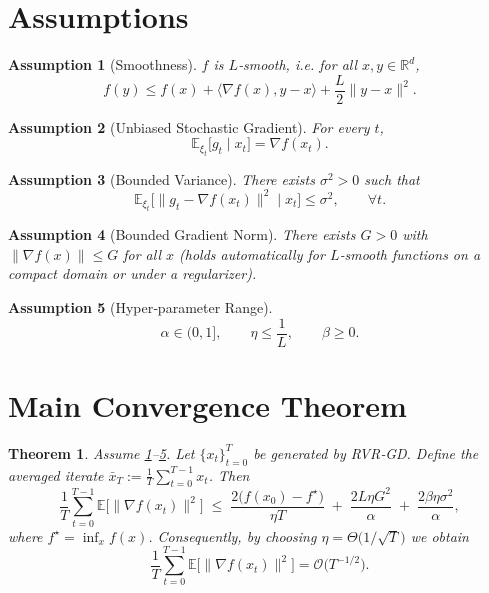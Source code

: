\documentclass{article}
\newtheorem{theorem}{Theorem}
\newtheorem{assumption}{Assumption}
\newcommand{\E}{\mathbb{E}}
\begin{document}
\section*{Assumptions}
\begin{assumption}[Smoothness]\label{as:smooth}
$f$ is $L$‑smooth, i.e. for all $x,y\in\mathbb{R}^d$,
\[
f(y)\le f(x)+\langle\nabla f(x),y-x\rangle+\frac{L}{2}\|y-x\|^2 .
\]
\end{assumption}
\begin{assumption}[Unbiased Stochastic Gradient]\label{as:unbiased}
For every $t$, 
\[
\E_{\xi_t}\bigl[g_t \mid x_t\bigr]=\nabla f(x_t).
\]
\end{assumption}
\begin{assumption}[Bounded Variance]\label{as:var}
There exists $\sigma^2>0$ such that
\[
\E_{\xi_t}\bigl[\|g_t-\nabla f(x_t)\|^2\mid x_t\bigr]\le\sigma^2,\qquad\forall t .
\]
\end{assumption}
\begin{assumption}[Bounded Gradient Norm]\label{as:gradbound}
There exists $G>0$ with $\|\nabla f(x)\|\le G$ for all $x$ (holds automatically for $L$‑smooth functions on a compact domain or under a regularizer).
\end{assumption}
\begin{assumption}[Hyper‑parameter Range]\label{as:hyper}
\[
\alpha\in(0,1],\qquad \eta\le\frac{1}{L},\qquad \beta\ge 0 .
\]
\end{assumption}

\section*{Main Convergence Theorem}
\begin{theorem}\label{thm:main}
Assume \ref{as:smooth}–\ref{as:hyper}. Let $\{x_t\}_{t=0}^{T}$ be generated by RVR‑GD. Define the averaged iterate $\bar x_T:=\frac1T\sum_{t=0}^{T-1}x_t$. Then
\[
\frac1T\sum_{t=0}^{T-1}\E\!\bigl[\|\nabla f(x_t)\|^2\bigr]\;\le\;
\frac{2\bigl(f(x_0)-f^\star\bigr)}{\eta T}
\;+\; \frac{2L\eta G^2}{\alpha}
\;+\; \frac{2\beta\eta\sigma^2}{\alpha},
\]
where $f^\star=\inf_{x}f(x)$. Consequently, by choosing $\eta = \Theta\!\bigl(1/\sqrt{T}\bigr)$ we obtain
\[
\frac1T\sum_{t=0}^{T-1}\E\!\bigl[\|\nabla f(x_t)\|^2\bigr]=\mathcal{O}\!\bigl(T^{-1/2}\bigr).
\]
\end{theorem}
\end{document}
